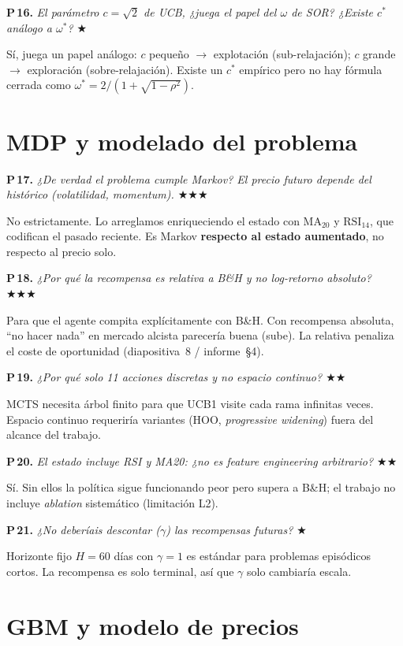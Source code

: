 \documentclass[11pt,a4paper]{article}
\newcommand{\preg}[2]{%
  \par\medskip
  \noindent\textbf{P\,#1.} \emph{#2}\par\smallskip}
\newcommand{\resp}[1]{%
  \noindent #1\par}
\begin{document}
\preg{16}{El parámetro $c=\sqrt{2}$ de UCB, ¿juega el papel del $\omega$
de SOR? ¿Existe $c^*$ análogo a $\omega^*$? \hfill$\bigstar$}
\resp{%
Sí, juega un papel análogo: $c$ pequeño $\to$ explotación (sub-relajación);
$c$ grande $\to$ exploración (sobre-relajación). Existe un $c^*$ empírico
pero no hay fórmula cerrada como
$\omega^*=2/(1+\sqrt{1-\rho^2})$.}

\section{MDP y modelado del problema}

\preg{17}{¿De verdad el problema cumple Markov? El precio futuro depende
del histórico (volatilidad, momentum). \hfill$\bigstar\bigstar\bigstar$}
\resp{%
No estrictamente. Lo arreglamos enriqueciendo el estado con $\mathrm{MA}_{20}$
y $\mathrm{RSI}_{14}$, que codifican el pasado reciente. Es Markov
\textbf{respecto al estado aumentado}, no respecto al precio solo.}

\preg{18}{¿Por qué la recompensa es relativa a B\&H y no log-retorno
absoluto? \hfill$\bigstar\bigstar\bigstar$}
\resp{%
Para que el agente compita explícitamente con B\&H. Con recompensa absoluta,
``no hacer nada'' en mercado alcista parecería buena (sube). La relativa
penaliza el coste de oportunidad (diapositiva~8 / informe~\S4).}

\preg{19}{¿Por qué solo 11 acciones discretas y no espacio continuo?
\hfill$\bigstar\bigstar$}
\resp{%
MCTS necesita árbol finito para que UCB1 visite cada rama infinitas veces.
Espacio continuo requeriría variantes (HOO, \emph{progressive widening})
fuera del alcance del trabajo.}

\preg{20}{El estado incluye RSI y MA20: ¿no es \emph{feature engineering}
arbitrario? \hfill$\bigstar\bigstar$}
\resp{%
Sí. Sin ellos la política sigue funcionando peor pero supera a B\&H;
el trabajo no incluye \emph{ablation} sistemático (limitación L2).}

\preg{21}{¿No deberíais descontar ($\gamma$) las recompensas futuras?
\hfill$\bigstar$}
\resp{%
Horizonte fijo $H=60$ días con $\gamma=1$ es estándar para problemas
episódicos cortos. La recompensa es solo terminal, así que $\gamma$ solo
cambiaría escala.}

\section{GBM y modelo de precios}
\end{document}
